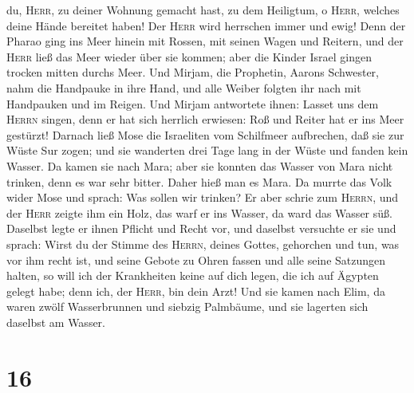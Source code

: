 du, \textsc{Herr}, zu deiner Wohnung gemacht hast, zu dem Heiligtum, o
\textsc{Herr}, welches deine Hände bereitet haben!  Der
\textsc{Herr} wird herrschen immer und ewig!  Denn der
Pharao ging ins Meer hinein mit Rossen, mit seinen Wagen und Reitern,
und der \textsc{Herr} ließ das Meer wieder über sie kommen; aber die
Kinder Israel gingen trocken mitten durchs Meer.  Und
Mirjam, die Prophetin, Aarons Schwester, nahm die Handpauke in ihre
Hand, und alle Weiber folgten ihr nach mit Handpauken und im Reigen.
 Und Mirjam antwortete ihnen: Lasset uns dem
\textsc{Herrn} singen, denn er hat sich herrlich erwiesen: Roß und
Reiter hat er ins Meer gestürzt!  Darnach ließ Mose die
Israeliten vom Schilfmeer aufbrechen, daß sie zur Wüste Sur zogen; und
sie wanderten drei Tage lang in der Wüste und fanden kein Wasser.
 Da kamen sie nach Mara; aber sie konnten das Wasser von
Mara nicht trinken, denn es war sehr bitter. Daher hieß man es Mara.
 Da murrte das Volk wider Mose und sprach: Was sollen wir
trinken?  Er aber schrie zum \textsc{Herrn}, und der
\textsc{Herr} zeigte ihm ein Holz, das warf er ins Wasser, da ward das
Wasser süß. Daselbst legte er ihnen Pflicht und Recht vor, und daselbst
versuchte er sie und sprach:  Wirst du der Stimme des
\textsc{Herrn}, deines Gottes, gehorchen und tun, was vor ihm recht ist,
und seine Gebote zu Ohren fassen und alle seine Satzungen halten, so
will ich der Krankheiten keine auf dich legen, die ich auf Ägypten
gelegt habe; denn ich, der \textsc{Herr}, bin dein Arzt! 
Und sie kamen nach Elim, da waren zwölf Wasserbrunnen und siebzig
Palmbäume, und sie lagerten sich daselbst am Wasser.

\hypertarget{section-15}{%
\section{16}\label{section-15}}

